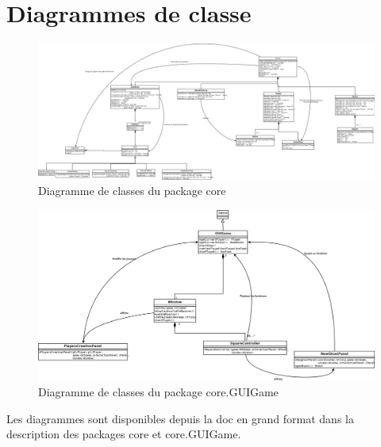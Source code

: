 \documentclass[]{report}
\begin{document}
\section{Diagrammes de classe}

\begin{figure}
	\caption{Diagramme de classes du package core}
	\includegraphics[width=\textwidth]{core.png}
\end{figure}

\begin{figure}
	\caption{Diagramme de classes du package core.GUIGame}
	\includegraphics[width=\textwidth]{core_GUIGame.png}
\end{figure}

Les diagrammes sont disponibles depuis la doc en grand format dans la description des packages core et core.GUIGame.
\end{document}
